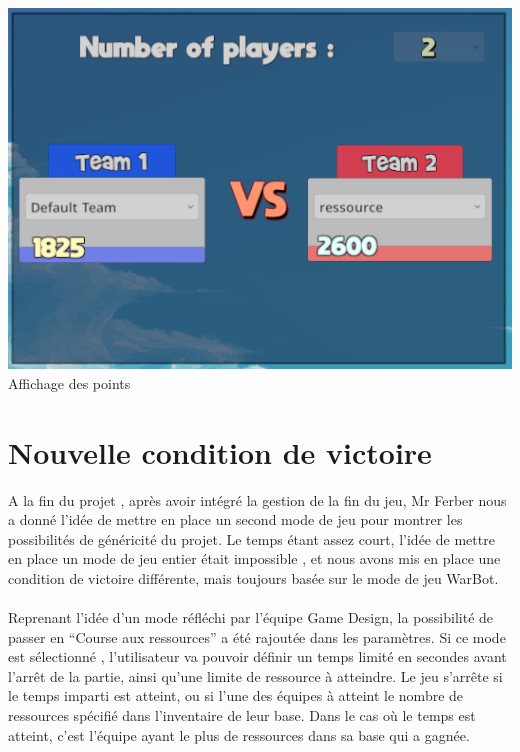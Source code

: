 \documentclass{report}
\begin{document}
\paragraph{}
\begin{center}
\includegraphics[scale=0.7]{DATA/Elo.png}
 {Affichage des points}
\end{center}
\paragraph{}

\newpage
\section{Nouvelle condition de victoire}
A la fin du projet , après avoir intégré la gestion de la fin du jeu, Mr Ferber nous a donné l’idée de mettre en place un second mode de jeu pour montrer les possibilités de généricité du projet. Le temps étant assez court, l’idée de mettre en place un mode de jeu entier était impossible , et nous avons mis en place une condition de victoire différente, mais toujours basée sur le mode de jeu WarBot.
\paragraph{}
Reprenant l’idée d’un mode réfléchi par l’équipe Game Design, la possibilité de passer en “Course aux ressources” a été rajoutée dans les paramètres. Si ce mode est sélectionné , l’utilisateur va pouvoir définir un temps limité en secondes avant l’arrêt de la partie, ainsi qu’une limite de ressource à atteindre. Le jeu s’arrête si le temps imparti est atteint, ou si l’une des équipes à atteint le nombre de ressources spécifié dans l’inventaire de leur base. Dans le cas où le temps est atteint, c’est l’équipe ayant le plus de ressources dans sa base qui a gagnée. 
\end{document}
